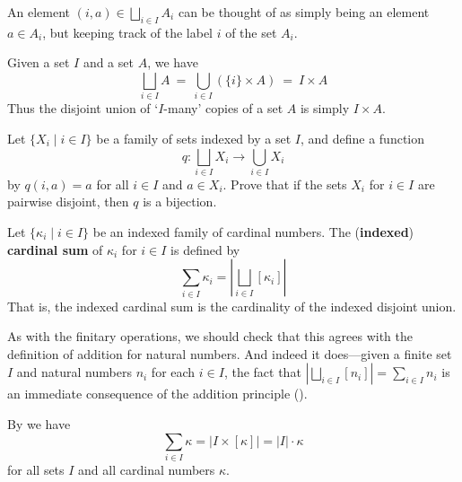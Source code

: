 An element $(i,a) \in \displaystyle \bigsqcup_{i \in I} A_i$ can be thought of as simply being an element $a \in A_i$, but keeping track of the label $i$ of the set $A_i$.

\begin{example}
\label{exDisjointUnionOfConstantFamily}
Given a set $I$ and a set $A$, we have
\[ \bigsqcup_{i \in I} A ~=~ \bigcup_{i \in I} (\{ i \} \times A) ~=~ I \times A \]
Thus the disjoint union of `$I$-many' copies of a set $A$ is simply $I \times A$.
\end{example}

\begin{exercise}
\label{exFunctionFromDisjointUnionToUnionIsBijectionIfPairwiseDisjoint}
Let $\{ X_i \mid i \in I \}$ be a family of sets indexed by a set $I$, and define a function
\[ q : \bigsqcup_{i \in I} X_i \to \bigcup_{i \in I} X_i \]
by $q(i,a) = a$ for all $i \in I$ and $a \in X_i$. Prove that if the sets $X_i$ for $i \in I$ are pairwise disjoint, then $q$ is a bijection.
\end{exercise}

\begin{definition}
\label{defIndexedCardinalSum}
Let $\{ \kappa_i \mid i \in I \}$ be an indexed family of cardinal numbers. The (\textbf{indexed}) \textbf{cardinal sum} of $\kappa_i$ for $i \in I$ is defined by
\[ \sum_{i \in I} \kappa_i = \left| \bigsqcup_{i \in I} [\kappa_i] \right| \]
That is, the indexed cardinal sum is the cardinality of the indexed disjoint union.
\end{definition}

As with the finitary operations, we should check that this agrees with the definition of addition for natural numbers. And indeed it does---given a finite set $I$ and natural numbers $n_i$ for each $i \in I$, the fact that $\left| \displaystyle \bigsqcup_{i \in I} [n_i] \right| = \sum_{i \in I} n_i$ is an immediate consequence of the addition principle ().

\begin{example}
By  we have
\[ \sum_{i \in I} \kappa = |I \times [\kappa]| = |I| \cdot \kappa \]
for all sets $I$ and all cardinal numbers $\kappa$.
\end{example}


